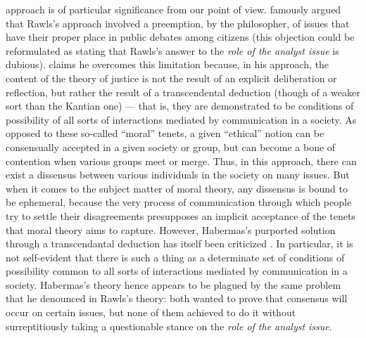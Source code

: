 \documentclass[version=3.21, pagesize, twoside=off, bibliography=totoc, DIV=calc, fontsize=12pt, a4paper, french, english]{scrartcl}
\begin{document}
 approach is of particular significance from our point of view. \citet{habermas_short_1999} famously argued that Rawls’s approach involved a preemption, by the philosopher, of issues that have their proper place in public debates among citizens (this objection could be reformulated as stating that Rawls’s answer to the \emph{role of the analyst issue} is dubious).
\citet{habermas_moralbewustsein_1983} claims he overcomes this limitation because, in his approach, the content of the theory of justice is not the result of an explicit deliberation or reflection, but rather the result of a transcendental deduction (though of a weaker sort than the Kantian one) --- that is, they are demonstrated to be conditions of possibility of all sorts of interactions mediated by communication in a society. As opposed to these so-called “moral” tenets, a given “ethical” notion can be consensually accepted in a given society or group, but can become a bone of contention when various groups meet or merge. 
Thus, in this approach, there can exist a dissensus between various individuals in the society on many issues. 
But when it comes to the subject matter of moral theory, any dissensus is bound to be ephemeral, because the very process of communication through which people try to settle their disagreements presupposes an implicit acceptance of the tenets that moral theory aims to capture. However, Habermas’s purported solution through a transcendantal deduction has itself been criticized \citep{heath_communicative_2001}. 
In particular, it is not self-evident that there is such a thing as a determinate set of conditions of possibility common to all sorts of interactions mediated by communication in a society. 
Habermas’s theory hence appears to be plagued by the same problem that he denounced in Rawls’s theory: both wanted to prove that consensus will occur on certain issues, but none of them achieved to do it without surreptitiously taking a questionable stance on the \emph{role of the analyst issue}. %
\end{document}
